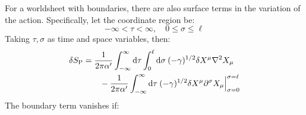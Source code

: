 For a worldsheet with boundaries, there are also surface terms in the variation of the action. 
Specifically, let the coordinate region be: 
\begin{equation}
	-\infty<\tau<\infty, \quad 0 \leq \sigma \leq \ell
\end{equation}
Taking $\tau, \sigma$ as time and space variables, then: 
\begin{align}
	\delta S_{\mathrm{P}}&=\frac{1}{2 \pi \alpha^{\prime}} \int_{-\infty}^{\infty} \mathrm{d}\tau \int_{0}^{\ell} \mathrm{d}\sigma\:(-\gamma)^{1 / 2} \delta X^{\mu} \nabla^{2} X_{\mu} \nonumber  \\
	&\qquad -\frac{1}{2 \pi \alpha^{\prime}} \int_{-\infty}^{\infty} \mathrm{d} \tau\: (-\gamma)^{1 / 2} \delta X^{\mu}
	\partial^{\sigma} X_{\mu}\Big\rvert_{\sigma=0}^{\sigma=\ell}
\end{align}
The boundary term vanishes if: 
